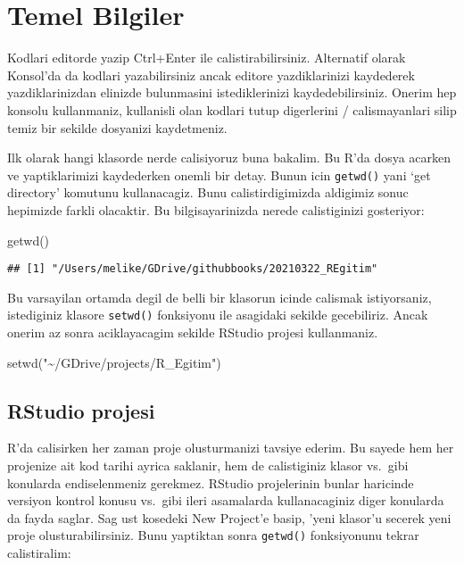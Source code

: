 \documentclass[
]{book}
\newenvironment{Shaded}{\begin{snugshade}}{\end{snugshade}}
\newcommand{\FunctionTok}[1]{\textcolor[rgb]{0.00,0.00,0.00}{#1}}
\newcommand{\NormalTok}[1]{#1}
\newcommand{\StringTok}[1]{\textcolor[rgb]{0.31,0.60,0.02}{#1}}
\begin{document}
\hypertarget{temel-bilgiler}{%
\chapter{Temel Bilgiler}\label{temel-bilgiler}}

Kodlari editorde yazip Ctrl+Enter ile calistirabilirsiniz. Alternatif olarak Konsol'da da kodlari yazabilirsiniz ancak editore yazdiklarinizi kaydederek yazdiklarinizdan elinizde bulunmasini istediklerinizi kaydedebilirsiniz. Onerim hep konsolu kullanmaniz, kullanisli olan kodlari tutup digerlerini / calismayanlari silip temiz bir sekilde dosyanizi kaydetmeniz.

Ilk olarak hangi klasorde nerde calisiyoruz buna bakalim. Bu R'da dosya acarken ve yaptiklarimizi kaydederken onemli bir detay. Bunun icin \texttt{getwd()} yani `get directory' komutunu kullanacagiz. Bunu calistirdigimizda aldigimiz sonuc hepimizde farkli olacaktir. Bu bilgisayarinizda nerede calistiginizi gosteriyor:

\begin{Shaded}
\begin{Highlighting}[]
\FunctionTok{getwd}\NormalTok{()}
\end{Highlighting}
\end{Shaded}

\begin{verbatim}
## [1] "/Users/melike/GDrive/githubbooks/20210322_REgitim"
\end{verbatim}

Bu varsayilan ortamda degil de belli bir klasorun icinde calismak istiyorsaniz, istediginiz klasore \texttt{setwd()} fonksiyonu ile asagidaki sekilde gecebiliriz. Ancak onerim az sonra aciklayacagim sekilde RStudio projesi kullanmaniz.

\begin{Shaded}
\begin{Highlighting}[]
\FunctionTok{setwd}\NormalTok{(}\StringTok{"\textasciitilde{}/GDrive/projects/R\_Egitim"}\NormalTok{)}
\end{Highlighting}
\end{Shaded}

\hypertarget{rstudio-projesi}{%
\section{RStudio projesi}\label{rstudio-projesi}}

R'da calisirken her zaman proje olusturmanizi tavsiye ederim. Bu sayede hem her projenize ait kod tarihi ayrica saklanir, hem de calistiginiz klasor vs.~gibi konularda endiselenmeniz gerekmez. RStudio projelerinin bunlar haricinde versiyon kontrol konusu vs.~gibi ileri asamalarda kullanacaginiz diger konularda da fayda saglar. Sag ust kosedeki New Project'e basip, 'yeni klasor'u secerek yeni proje olusturabilirsiniz. Bunu yaptiktan sonra \texttt{getwd()} fonksiyonunu tekrar calistiralim:
\end{document}
